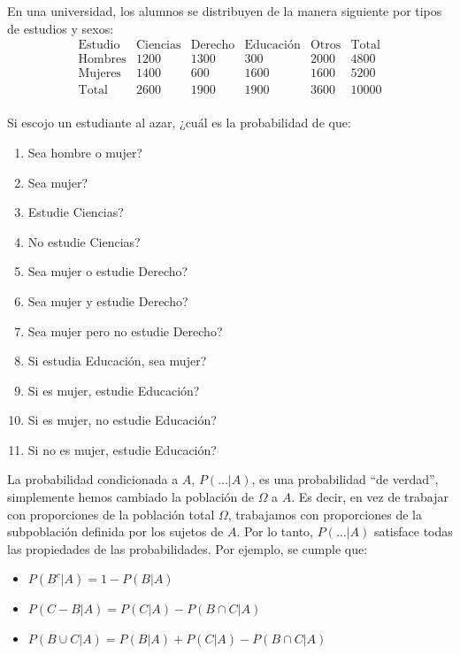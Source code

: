 \documentclass[
]{book}
\providecommand{\tightlist}{%
  \setlength{\itemsep}{0pt}\setlength{\parskip}{0pt}}
\theoremstyle{definition}
\theoremstyle{definition}
\theoremstyle{definition}
\theoremstyle{definition}
\theoremstyle{remark}
\begin{document}
\begin{rmdexercici}
En una universidad, los alumnos se distribuyen de la manera siguiente por tipos de estudios y sexos:
\[
\begin{array}{r|c|c|c|c|c}
\text{Estudio} & \text{Ciencias} & \text{Derecho} & \text{Educación} & \text{Otros} &  \text{Total}\\ \hline
\text{Hombres} & 1200 & 1300 &  300 & 2000 & 4800\\ \hline
\text{Mujeres} & 1400 & 600 & 1600 & 1600 & 5200\\ \hline
\text{Total} & 2600  &1900 & 1900 &  3600 & 10000\\  
\end{array}
\]

Si escojo un estudiante al azar, ¿cuál es la probabilidad de que:

\begin{enumerate}
\def\labelenumi{\alph{enumi}.}
\tightlist
\item
  Sea hombre o mujer?
\item
  Sea mujer?
\item
  Estudie Ciencias?
\item
  No estudie Ciencias?
\item
  Sea mujer o estudie Derecho?
\item
  Sea mujer y estudie Derecho?
\item
  Sea mujer pero no estudie Derecho?
\item
  Si estudia Educación, sea mujer?
\item
  Si es mujer, estudie Educación?
\item
  Si es mujer, no estudie Educación?
\item
  Si no es mujer, estudie Educación?
\end{enumerate}
\end{rmdexercici}

La probabilidad condicionada a \(A\), \(P(\ldots|A)\), es una probabilidad ``de verdad'', simplemente hemos cambiado la población de \(\Omega\) a \(A\). Es decir, en vez de trabajar con proporciones de la población total \(\Omega\), trabajamos con proporciones de la subpoblación definida por los sujetos de \(A\). Por lo tanto, \(P(\ldots |A)\) satisface todas las propiedades de las probabilidades. Por ejemplo, se cumple que:

\begin{itemize}
\tightlist
\item
  \(P(B^c|A)=1-P(B|A)\)
\item
  \(P(C-B|A)=P(C|A)-P(B\cap C|A)\)
\item
  \(P(B\cup C|A)=P(B|A)+P(C|A)-P(B\cap C|A)\)
\end{itemize}
\end{document}
